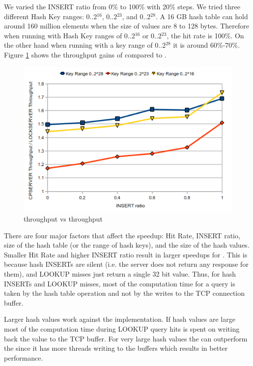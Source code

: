 We varied the INSERT ratio from 0\% to 100\% with 20\% steps. We tried three different Hash Key ranges: 0..2$^{16}$, 0..2$^{23}$, and 0..2$^{28}$. A 16 GB hash table
can hold around 160 million elements when the size of values are 8 to 128 bytes. Therefore when running with Hash Key ranges of 0..2$^{16}$ or 0..2$^{23}$, the hit rate 
is 100\%. On the other hand when running with a key range of 0..2$^{28}$ it is around 60\%-70\%. Figure \ref{fig:cpserverspeedup} shows the throughput gains of 
\cpserver{} compared to \lockserver{}.

\begin{figure}[!ht]
  \centering
  \includegraphics[width=0.8\linewidth]{figs/cpserverspeedup.png}
  \caption{\cpserver{} throughput vs \lockserver{} throughput}
  \label{fig:cpserverspeedup}
\end{figure}

There are four major factors that affect the speedup: Hit Rate, INSERT ratio, size of the hash table (or the range of hash keys), and the size of the hash values. 
Smaller Hit Rate and higher INSERT ratio result in larger speedups for \cpserver{}. This is because hash INSERTs are silent (i.e. the server does not return 
any response for them), and LOOKUP misses just return a single 32 bit value. Thus, for hash INSERTs and LOOKUP misses, most of the computation time for a query is taken by 
the hash table operation and not by the writes to the TCP connection buffer. 

Larger hash values work against the \cpserver{} implementation. If hash values are large most of the computation time during LOOKUP query hits is spent on 
writing back the value to the TCP buffer. For very large hash values the \lockserver{} can outperform the \cpserver{} since it has more threads 
writing to the buffers which results in better performance.

